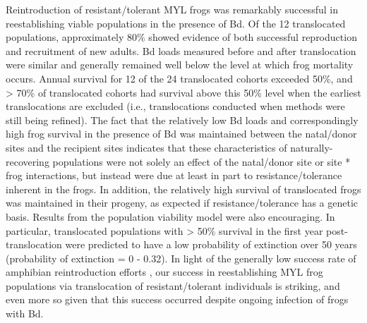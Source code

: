\documentclass[9pt,twocolumn,twoside,lineno]{pnas-new}
\begin{document}
Reintroduction of resistant/tolerant MYL frogs was remarkably successful
in reestablishing viable populations in the presence of Bd. Of the 12
translocated populations, approximately 80\% showed evidence of both
successful reproduction and recruitment of new adults. Bd loads measured
before and after translocation were similar and generally remained well
below the level at which frog mortality occurs. Annual survival for 12
of the 24 translocated cohorts exceeded 50\%, and \textgreater{} 70\% of
translocated cohorts had survival above this 50\% level when the
earliest translocations are excluded (i.e., translocations conducted
when methods were still being refined). The fact that the relatively low
Bd loads and correspondingly high frog survival in the presence of Bd
was maintained between the natal/donor sites and the recipient sites
indicates that these characteristics of naturally-recovering populations
were not solely an effect of the natal/donor site or site * frog
interactions, but instead were due at least in part to
resistance/tolerance inherent in the frogs. In addition, the relatively
high survival of translocated frogs was maintained in their progeny, as
expected if resistance/tolerance has a genetic basis. Results from the
population viability model were also encouraging. In particular,
translocated populations with \textgreater{} 50\% survival in the first
year post-translocation were predicted to have a low probability of
extinction over 50 years (probability of extinction = 0 - 0.32). In
light of the generally low success rate of amphibian reintroduction
efforts \citep{dodd2005}, our success in reestablishing MYL frog
populations via translocation of resistant/tolerant individuals is
striking, and even more so given that this success occurred despite
ongoing infection of frogs with Bd.
\end{document}
